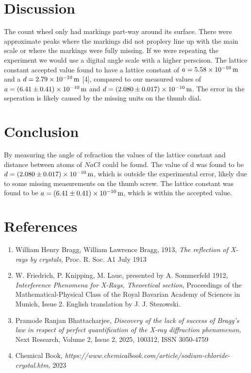 \documentclass{article}
\begin{document}
    \section{Discussion}
        The count wheel only had markings part-way around its surface. There were approximate peaks where the markings did not proplery line up with the main scale or where the markings were fully missing. If we were repeating the experiment we would use a digital angle scale with a higher perscison. The lattice constant accepted value found to have a lattice constant of $a = \qty{5.58E-10}{\m}$ and a $d = \qty{2.79E-10}{\m}$ [4], compared to our measured values of $a = \qty{6.41(0.41)E-10}{\m}$ and $d = \qty{2.08(0.017)E-10}{\m}$. The error in the seperation is likely caused by the missing units on the thumb dial.
    \section{Conclusion}
       By measuring the angle of refraction the values of the lattice constant and distance between atoms of $NaCl$ could be found. The value of d was found to be $d = \qty{2.08(0.017)E-10}{\m}$, which is outside the experimental error, likely due to some missing measurements on the thumb screw. The lattice constant was found to be $a = \qty{6.41(0.41)E-10}{\m}$, which is within the accepted value.
    \section{References}
        \begin{enumerate}
            \item William Henry Bragg, William Lawrence Bragg, 1913, \emph{The reflection of X-rays by crystals}, Proc. R. Soc. A1 July 1913
            \item  W. Friedrich, P. Knipping, M. Laue, presented by A. Sommerfeld 1912, \emph{Interference Phenomena for X-Rays, Theoretical section}, Proceedings of the Mathematical-Physical Class of the Royal Bavarian Academy of Sciences in Munich, Issue 2. English translation by J. J. Stezowski.
            \item Pramode Ranjan Bhattacharjee, \emph{Discovery of the lack of success of Bragg's law in respect of perfect quantification of the X-ray diffraction phenomenon,} Next Research, Volume 2, Issue 2, 2025, 100312, ISSN 3050-4759
            \item Chemical Book, \emph{https://www.chemicalbook.com/article/sodium-chloride-crystal.htm}, 2023
        \end{enumerate}
\end{document}
